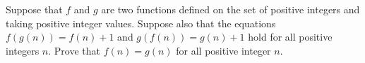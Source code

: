Suppose that $f$ and $g$ are two functions defined on the set of positive integers and taking positive integer values. Suppose also that the equations $f(g(n)) = f(n) + 1$ and $g(f(n)) = g(n) + 1$ hold for all positive integers $n$. Prove that $f(n) = g(n)$ for all positive integer $n$.
